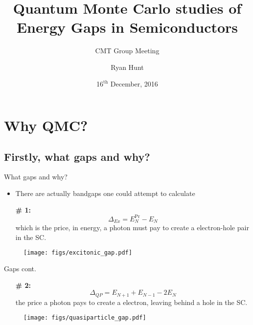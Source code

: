 \documentclass[12pt, pdf, hyperref={draft}, usenames, dvipsnames]{beamer}
\title{Quantum Monte Carlo studies of \\
       Energy Gaps in Semiconductors}
\subtitle{CMT Group Meeting}
\author{Ryan Hunt}
\date{16$^{\text{th}}$ December, 2016}
\newcommand{\red}[1]{{\bf\color{LancsRed}{#1}}}
\newcommand{\blue}[1]{{\bf\color{NavyBlue}{#1}}}
\begin{document}
\begin{frame}[plain]
  \titlepage
\end{frame}



\section{Why QMC?}

\subsection{Firstly, what gaps and why?}
\begin{frame}{What gaps and why?}{}
  \begin{itemize}
  \item There are actually \blue{two} bandgaps one could attempt to calculate

  \item[ \bf \# 1: ] \red{Excitonic Gap}
  \begin{equation}
  \Delta_{Ex} = E^{\text{Pr}}_N-E_N
  \end{equation}
  which is the price, in energy, a photon must pay to create a \blue{bound}
  electron-hole pair in the SC.
  \end{itemize}
  \vfill
  \begin{figure}[H]

  \centering
    \texttt{[image: figs/excitonic\_gap.pdf]}

  \end{figure}

\end{frame}


\begin{frame}{Gaps cont.}{}
  \begin{itemize}

  \item[ \bf \# 2: ] \red{Quasiparticle Gap}
  \begin{equation}
  \Delta_{QP} = E_{N+1} + E_{N-1} - 2E_{N}
  \end{equation}
  the price a photon pays to create a \blue{free} electron, leaving behind a
  hole in the SC.

  \end{itemize}
  \vfill
  \begin{figure}[H]

  \centering
    \texttt{[image: figs/quasiparticle\_gap.pdf]}

  \end{figure}

\end{frame}
\end{document}
